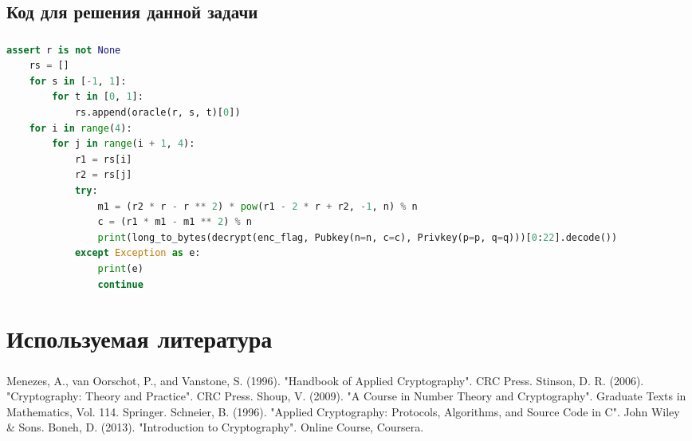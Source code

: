 \documentclass[t]{beamer}
\begin{document}
\subsection{Код для решения данной задачи}
\begin{frame}[fragile]
\frametitle{\insertsection} 
\framesubtitle{\insertsubsection}
\footnotesize
\smaller
\begin{lstlisting}[language=Python]
    assert r is not None
    rs = []
    for s in [-1, 1]:
        for t in [0, 1]:
            rs.append(oracle(r, s, t)[0])
    for i in range(4):
        for j in range(i + 1, 4):
            r1 = rs[i]
            r2 = rs[j]
            try:
                m1 = (r2 * r - r ** 2) * pow(r1 - 2 * r + r2, -1, n) % n
                c = (r1 * m1 - m1 ** 2) % n
                print(long_to_bytes(decrypt(enc_flag, Pubkey(n=n, c=c), Privkey(p=p, q=q)))[0:22].decode())
            except Exception as e:
                print(e)
                continue
\end{lstlisting}	
\end{frame}

\section{Используемая литература}

\begin{frame}
    \frametitle{\insertsection}
    \begin{thebibliography}{1}
    Menezes, A., van Oorschot, P., and Vanstone, S. (1996). "Handbook of Applied Cryptography". CRC Press.\newline
    Stinson, D. R. (2006). "Cryptography: Theory and Practice". CRC Press. \newline 
    Shoup, V. (2009). "A Course in Number Theory and Cryptography". Graduate Texts in Mathematics, Vol. 114. Springer.
    Schneier, B. (1996). "Applied Cryptography: Protocols, Algorithms, and Source Code in C". John Wiley & Sons.\newline
    Boneh, D. (2013). "Introduction to Cryptography". Online Course, Coursera.
    \end{thebibliography}
\end{frame}
\end{document}
